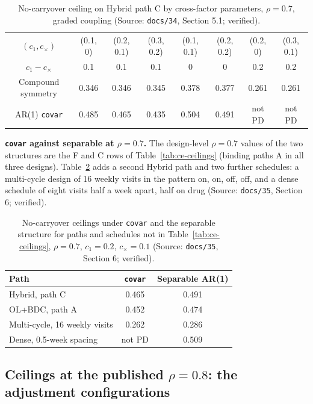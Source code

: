 \documentclass[11pt]{article}
\newcommand{\code}[1]{\texttt{#1}}
\begin{document}
\begin{table}[h]
\centering\small
\caption{No-carryover ceiling on Hybrid path C by cross-factor
parameters, $\rho = 0.7$, graded coupling (Source: \code{docs/34},
Section 5.1; verified).}
\label{tab:inve-cross}
\begin{tabular}{@{}cccccccc@{}}
\toprule
$(c_1, c_\times)$ & (0.1, 0) & (0.2, 0.1) & (0.3, 0.2) & (0.1, 0.1) & (0.2, 0.2) & (0.2, 0) & (0.3, 0.1) \\
$c_1 - c_\times$ & 0.1 & 0.1 & 0.1 & 0 & 0 & 0.2 & 0.2 \\
\midrule
Compound symmetry & 0.346 & 0.346 & 0.345 & 0.378 & 0.377 & 0.261 & 0.261 \\
AR(1) \code{covar} & 0.485 & 0.465 & 0.435 & 0.504 & 0.491 & not PD & not PD \\
\bottomrule
\end{tabular}
\end{table}

\textbf{\code{covar} against separable at $\rho = 0.7$.}
The design-level $\rho = 0.7$ values of the two structures are the
F and C rows of Table~\ref{tab:ce-ceilings} (binding paths A in all
three designs). Table~\ref{tab:inve-sep7} adds a second Hybrid path and
two further schedules: a multi-cycle design of 16 weekly visits in the
pattern on, on, off, off, and a dense schedule of eight visits half a
week apart, half on drug (Source: \code{docs/35}, Section 6; verified).

\begin{table}[h]
\centering\small
\caption{No-carryover ceilings under \code{covar} and the separable
structure for paths and schedules not in Table~\ref{tab:ce-ceilings},
$\rho = 0.7$, $c_1 = 0.2$, $c_\times = 0.1$ (Source: \code{docs/35},
Section 6; verified).}
\label{tab:inve-sep7}
\begin{tabular}{@{}lcc@{}}
\toprule
Path & \code{covar} & Separable AR(1) \\
\midrule
Hybrid, path C & 0.465 & 0.491 \\
OL+BDC, path A & 0.452 & 0.474 \\
Multi-cycle, 16 weekly visits & 0.262 & 0.286 \\
Dense, 0.5-week spacing & not PD & 0.509 \\
\bottomrule
\end{tabular}
\end{table}

\subsection{Ceilings at the published $\rho = 0.8$: the adjustment
configurations}
\label{sec:inve-ce-rho8}
\end{document}
